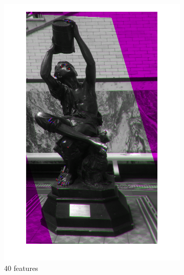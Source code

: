 \documentclass{article}
\begin{document}
\begin{figure}[h]
\begin{subfigure}[b]{0.3\textwidth}
		\includegraphics[width=\textwidth]{figures/alignment/fused_40_features_16_iterations}
		\caption{40 features}
	\end{subfigure}
	\begin{subfigure}[b]{0.3\textwidth}
		\centering

\end{subfigure}
\end{figure}
\end{document}
